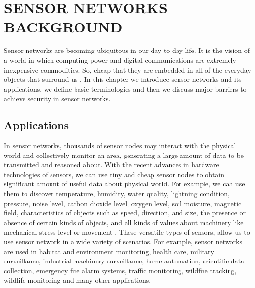 \chapter{SENSOR NETWORKS BACKGROUND} 
\label{cha:Sensor Networks/Data Aggregation/Security Background}
	
	Sensor networks are becoming ubiquitous in our day to day life. 
	It is the vision of a world in which computing power and digital communications are extremely inexpensive commodities.
	So, cheap that they are embedded in all of the everyday objects that surround us \cite{2002-Stajano-ubiquitous}.	
	In this chapter we introduce sensor networks and its applications, we define basic terminologies and then we discuss major 
	barriers to achieve security in sensor networks.

\section{Applications}
	In sensor networks, thousands of sensor nodes may interact with the physical world and collectively monitor an area, generating a large amount of data to be transmitted and reasoned about.
	With the recent advances in hardware technologies of sensors, we can use tiny and cheap sensor nodes to obtain significant amount of useful data about physical world.
	For example, we can use them to discover temperature, humidity, water quality, lightning condition, pressure, noise level, carbon dioxide level, oxygen level, soil moisture, magnetic field, characteristics of objects such as speed, direction, and size, the presence or absence of certain kinds of objects, and all kinds of values about machinery like mechanical stress level or movement \cite{hof2007applications}.
	These versatile types of sensors, allow us to use sensor network in a wide variety of scenarios.
	For example, sensor networks are used in habitat and environment monitoring, health care, military surveillance, industrial machinery surveillance, home automation, scientific data collection, emergency fire alarm systems, traffic monitoring, wildfire tracking, wildlife monitoring and many other applications.
	

